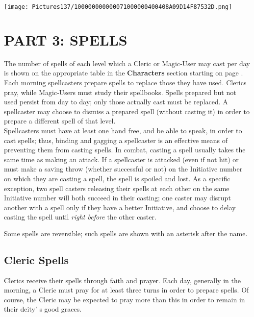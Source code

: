 \documentclass[a4paper,twoside,openany,10pt]{book}
\begin{document}
\vfill

\texttt{[image: Pictures137/100000000000071000000400408A09D14F87532D.png]}

\pagebreak

\section{PART 3: SPELLS}\label{part-3-spells}

\begin{multicols}{2}
	
The number of spells of each level which a Cleric or Magic-User may cast
per day is shown on the appropriate table in the \textbf{Characters} section starting on page \hyperlink{part-2-player-characters}{\pageref{part-2-player-characters}}. Each morning spellcasters prepare spells to replace those they have used. Clerics pray, while Magic-Users must study their spellbooks. Spells prepared but not used persist from day to day; only those actually cast must be replaced. A spellcaster may choose to dismiss a prepared spell (without casting it) in order to prepare a different spell of that level.\\

Spellcasters must have at least one hand free, and be able to speak, in order to cast spells; thus, binding and gagging a spellcaster is an effective means of preventing them from casting spells. In combat, casting a spell usually takes the same time as making an attack. If a spellcaster is attacked (even if not hit) or must make a saving throw (whether successful or not) on the Initiative number on which they are casting a spell, the spell is spoiled and lost. As a specific exception, two spell casters releasing their spells at each other on the same Initiative number will both succeed in their casting; one caster may disrupt another with a spell only if they have a better Initiative, and choose to delay casting the spell until \emph{right before} the other caster.

Some spells are reversible; such spells are shown with an asterisk after the name.

\subsection{Cleric Spells}\label{cleric-spells}

Clerics receive their spells through faith and prayer. Each day, generally in the morning, a Cleric must pray for at least three turns in order to prepare spells. Of course, the Cleric may be expected to pray more than this in order to remain in their deity' s good graces.


\end{multicols}
\end{document}
